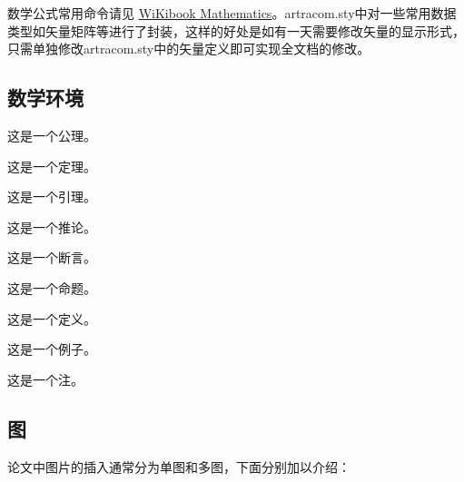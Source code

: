 {数学公式常用命令请见 \href{https://en.wikibooks.org/wiki/LaTeX/Mathematics}{WiKibook Mathematics}。artracom.sty中对一些常用数据类型如矢量矩阵等进行了封装，这样的好处是如有一天需要修改矢量的显示形式，只需单独修改artracom.sty中的矢量定义即可实现全文档的修改。

\subsection{数学环境}

\begin{axiom}
   这是一个公理。 
\end{axiom}
\begin{theorem}
   这是一个定理。 
\end{theorem}
\begin{lemma}
   这是一个引理。 
\end{lemma}
\begin{corollary}
   这是一个推论。 
\end{corollary}
\begin{assertion}
   这是一个断言。 
\end{assertion}
\begin{proposition}
   这是一个命题。 
\end{proposition}
\begin{definition}
    这是一个定义。
\end{definition}
\begin{example}
    这是一个例子。
\end{example}
\begin{remark}
    这是一个注。
\end{remark}

\subsection{图}

论文中图片的插入通常分为单图和多图，下面分别加以介绍：

}
